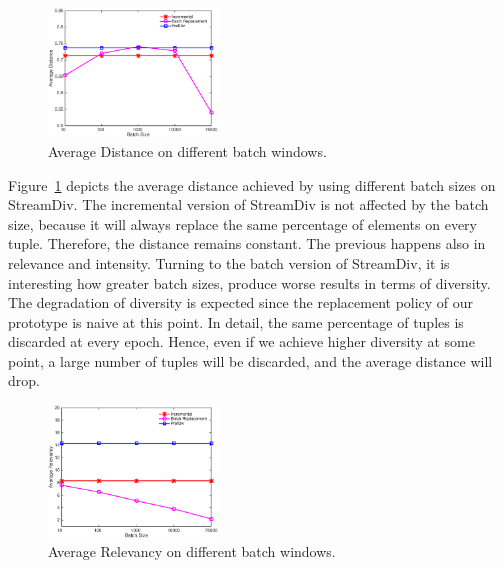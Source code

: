 \begin{table}[!tb] 
\centering
\caption{PARAMETER CONFIGURATION}
\label{table:par}
\end{table}

\begin{figure}[!htb]
\centering
\includegraphics[width=0.4\textwidth,height=0.4\textheight,keepaspectratio]{Figures/AverageDistance.eps}
\caption{Average Distance on different batch windows.}
\label{fig:avg-distance}
\end{figure}

Figure~\ref{fig:avg-distance} depicts the average distance
achieved by using different batch sizes on StreamDiv.
The incremental version of StreamDiv is not affected by
the batch size, because it will always replace the
same percentage of elements on every tuple.
Therefore, the distance remains constant.
The previous happens also in
relevance and intensity.
Turning to the batch version of StreamDiv, it is interesting
how greater batch sizes, produce worse results in terms of diversity.
The degradation of diversity is expected since the replacement
policy of our prototype is naive at this point.
In detail, the same percentage of tuples
is discarded at every epoch. Hence, even if we achieve
higher diversity at some point, a large number of tuples
will be discarded, and the average distance will drop.

\begin{figure}[!htb]
\centering
\includegraphics[width=0.4\textwidth,height=0.4\textheight,keepaspectratio]{Figures/AverageRelevancy.eps}
\caption{Average Relevancy on different batch windows.}
\label{fig:avg-relevancy}
\end{figure}

